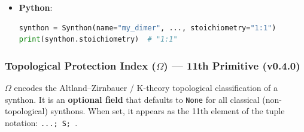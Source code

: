 \documentclass[12pt,a4paper]{article}
\begin{document}
\begin{itemize}
    \item 
    \textbf{Python}:

    \begin{lstlisting}[language=Python]
synthon = Synthon(name="my_dimer", ..., stoichiometry="1:1")
print(synthon.stoichiometry)  # "1:1"
\end{lstlisting}

\end{itemize}

\subsubsection{Topological Protection Index ($\Omega$) --- 11th Primitive (v0.4.0)}

$\Omega$ encodes the Altland--Zirnbauer / K-theory topological classification of a synthon. It is an \textbf{optional field} that defaults to \texttt{None} for all classical (non-topological) synthons. When set, it appears as the 11th element of the tuple notation: \texttt{\langle...; S; \Omega\rangle}.
\end{document}

